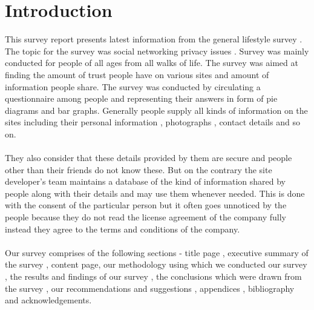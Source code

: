 \documentclass[11pt]{book}
\begin{document}
\tableofcontents
{}
\chapter{Introduction}
This  survey  report  presents   latest  information  from  the  general  lifestyle  survey . The  topic  for the survey was social networking  privacy issues  . 
Survey  was  mainly conducted  for people  of  all  ages  from  all  walks  of  life.  
The  survey  was  aimed  at finding the amount of trust people have on various sites and amount of information people share. 
The survey was conducted by circulating a questionnaire among people and  representing their answers in form of pie diagrams and bar graphs. 
Generally people supply all kinds of information on the sites including their personal information , photographs , contact details and so on. 
\\\\They also consider that these details provided by them are secure and people other than their friends do not know these. 
But on the contrary the site developer's team maintains a database of the kind of information shared by people along with their details and may use them whenever needed. 
This is done with the consent of the particular person but it often goes unnoticed by the people because they do not read the license agreement of the company fully instead they agree to the terms and conditions of the company. 
\\\\Our survey comprises of the following sections - title page , executive summary of the survey , content page,  our methodology using which we conducted our survey , the results and findings of our survey , the conclusions which were drawn from the survey , our recommendations and suggestions  ,  appendices , bibliography and acknowledgements.  
\end{document}
